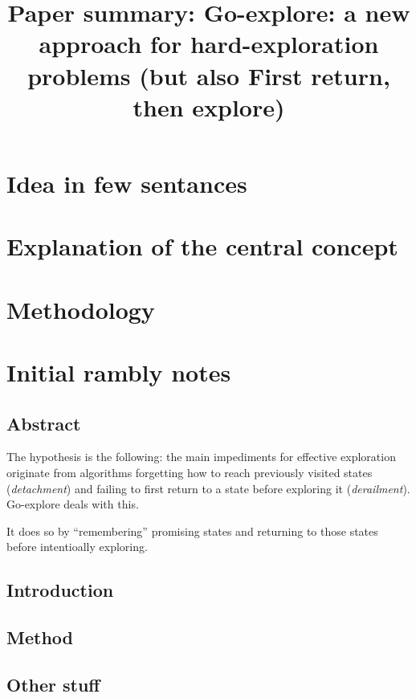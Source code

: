 \documentclass{article}
\title{Paper summary: Go-explore: a new approach for hard-exploration problems (but also First return, then explore)}
\begin{document}
\maketitle


\section{Idea in few sentances}



\section{Explanation of the central concept}




\section{Methodology}


\section{Initial rambly notes}

\subsection{Abstract}
The hypothesis is the following:
the main impediments for effective exploration originate from algorithms forgetting
how to reach previously visited states (\textit{detachment}) and failing to first return to a state
before exploring it (\textit{derailment}).
Go-explore deals with this.

It does so by ``remembering'' promising states and returning to those states before intentioally exploring.
\subsection{Introduction}

\subsection{Method}

\subsection{Other stuff}
\end{document}
